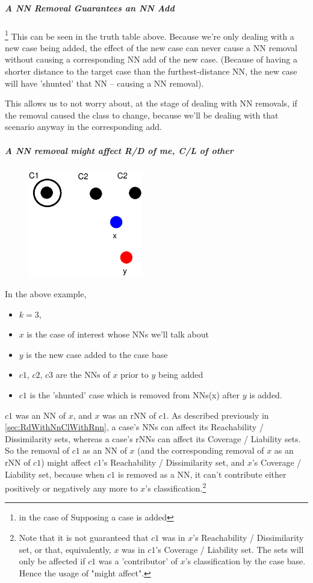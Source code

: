 \documentclass[a4paper,11pt]{report}
\begin{document}
\subparagraph{A NN Removal Guarantees an NN Add} \footnote{in the case of Supposing a case is added}
This can be seen in the truth table above. Because we're only dealing with a new case being added, the effect of the new case can never cause a NN removal without causing a corresponding NN add of the new case. (Because of having a shorter distance to the target case than the furthest-distance NN, the new case will have 'shunted' that NN – causing a NN removal).

This allows us to not worry about, at the stage of dealing with NN removals, if the removal caused the class to change, because we'll be dealing with that scenario anyway in the corresponding add.

\subparagraph{A NN removal might affect R/D of me, C/L of other}

\begin{figure}[h!]
\includegraphics[width=5cm]{./Drawn/NnMightAffectEg}
\end{figure}


In the above example,
\begin{itemize}
	\item $k=3$, 
	\item $x$ is the case of interest whose NNs  we'll talk about
	\item $y$ is the new case added to the case base
	\item $c1$, $c2$, $c3$ are the NNs of $x$ prior to $y$ being added
	\item $c1$ is the 'shunted' case which is removed from NNs(x) after $y$ is added.
\end{itemize}

$c1$ was an NN of $x$, and $x$ was an rNN of $c1$. As described previously in \ref{sec:RdWithNnClWithRnn}, a case's NNs can affect its Reachability / Dissimilarity sets, whereas a case's rNNs can affect its Coverage / Liability sets. So the removal of $c1$ as an NN of $x$ (and the corresponding removal of $x$ as an rNN of $c1$) might affect $c1$'s Reachability / Dissimilarity set, and $x$'s Coverage / Liability set, because when $c1$ is removed as a NN, it can't contribute either positively or negatively any more to $x$'s classification.\footnote{Note that it is not guaranteed that $c1$ was in $x$'s Reachability / Dissimilarity set, or that, equivalently, $x$ was in $c1$'s Coverage / Liability set. The sets will only be affected if $c1$ was a 'contributor' of $x$'s classification by the case base. Hence the usage of "might affect".}
\end{document}
